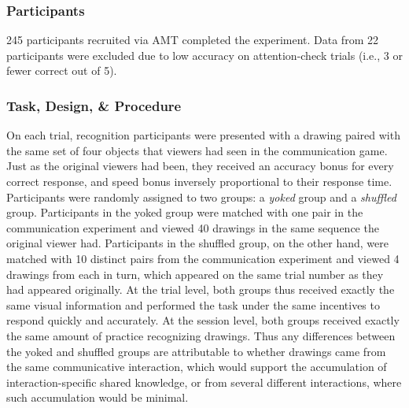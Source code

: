 \documentclass[10pt,letterpaper]{article}
\begin{document}
\subsubsection{Participants}

245 participants recruited via AMT completed the experiment. Data from 22 participants were excluded due to low accuracy on attention-check trials (i.e., 3 or fewer correct out of 5).  

\subsubsection{Task, Design, \& Procedure}


On each trial, recognition participants were presented with a drawing paired with the same set of four objects that viewers had seen in the communication game. 
Just as the original viewers had been, they received an accuracy bonus for every correct response, and speed bonus inversely proportional to their response time. 
Participants were randomly assigned to two groups: a \textit{yoked} group and a \textit{shuffled} group. 
Participants in the yoked group were matched with one pair in the communication experiment and viewed 40 drawings in the same sequence the original viewer had. 
Participants in the shuffled group, on the other hand, were matched with 10 distinct pairs from the communication experiment and viewed 4 drawings from each in turn, which appeared on the same trial number as they had appeared originally. 
At the trial level, both groups thus received exactly the same visual information and performed the task under the same incentives to respond quickly and accurately. 
At the session level, both groups received exactly the same amount of practice recognizing drawings.
Thus any differences between the yoked and shuffled groups are attributable to whether drawings came from the same communicative interaction, which would support the accumulation of interaction-specific shared knowledge, or from several different interactions, where such accumulation would be minimal.
\end{document}
